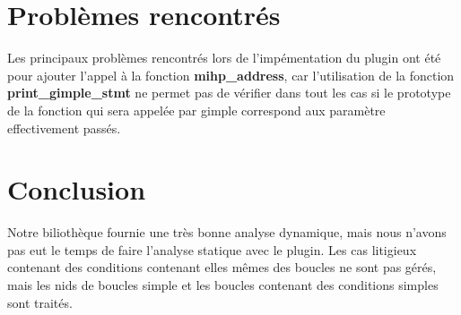 \documentclass[12pt,french]{article}
\begin{document}
\section{\color{blue}Problèmes rencontrés}

Les principaux problèmes rencontrés lors de l'impémentation du plugin ont été pour ajouter l'appel à la fonction \textbf{mihp\_address}, car l'utilisation de la fonction \textbf{print\_gimple\_stmt} ne permet pas de vérifier dans tout les cas si le prototype de la fonction qui sera appelée par gimple correspond aux paramètre effectivement passés.

\section{\color{blue}Conclusion}

Notre biliothèque fournie une très bonne analyse dynamique, mais nous n'avons pas eut le temps de faire l'analyse statique avec le plugin. Les cas litigieux contenant des conditions contenant elles mêmes des boucles ne sont pas gérés, mais les nids de boucles simple et les boucles contenant des conditions simples sont traités.
\end{document}
